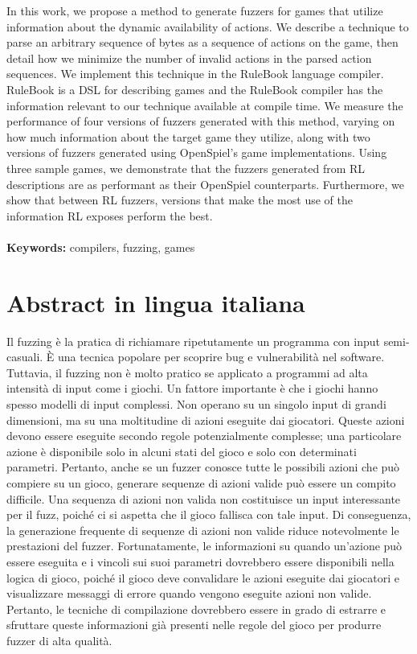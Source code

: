 \documentclass{Configuration_Files/PoliMi3i_thesis}
\begin{document}
In this work, we propose a method to generate fuzzers for games that utilize information about the dynamic availability of actions.
We describe a technique to parse an arbitrary sequence of bytes as a sequence of actions on the game, then detail how we minimize the number of invalid actions in the parsed action sequences.
We implement this technique in the RuleBook language compiler. RuleBook is a DSL for describing games and the RuleBook compiler has the information relevant to our technique available at compile time.
We measure the performance of four versions of fuzzers generated with this method, varying on how much information about the target game they utilize, along with two versions of fuzzers generated using OpenSpiel's game implementations.
Using three sample games, we demonstrate that the fuzzers generated from RL descriptions are as performant as their OpenSpiel counterparts.
Furthermore, we show that between RL fuzzers, versions that make the most use of the information RL exposes perform the best.
\\
\\
\textbf{Keywords:} compilers, fuzzing, games

\chapter*{Abstract in lingua italiana}
Il fuzzing è la pratica di richiamare ripetutamente un programma con input semi-casuali.
È una tecnica popolare per scoprire bug e vulnerabilità nel software.
Tuttavia, il fuzzing non è molto pratico se applicato a programmi ad alta intensità di input come i giochi.
Un fattore importante è che i giochi hanno spesso modelli di input complessi.
Non operano su un singolo input di grandi dimensioni, ma su una moltitudine di azioni eseguite dai giocatori.
Queste azioni devono essere eseguite secondo regole potenzialmente complesse; una particolare azione è disponibile solo in alcuni stati del gioco e solo con determinati parametri.
Pertanto, anche se un fuzzer conosce tutte le possibili azioni che può compiere su un gioco, generare sequenze di azioni valide può essere un compito difficile.
Una sequenza di azioni non valida non costituisce un input interessante per il fuzz, poiché ci si aspetta che il gioco fallisca con tale input.
Di conseguenza, la generazione frequente di sequenze di azioni non valide riduce notevolmente le prestazioni del fuzzer.
Fortunatamente, le informazioni su quando un'azione può essere eseguita e i vincoli sui suoi parametri dovrebbero essere disponibili nella logica di gioco, poiché il gioco deve convalidare le azioni eseguite dai giocatori e visualizzare messaggi di errore quando vengono eseguite azioni non valide.
Pertanto, le tecniche di compilazione dovrebbero essere in grado di estrarre e sfruttare queste informazioni già presenti nelle regole del gioco per produrre fuzzer di alta qualità.
\end{document}
